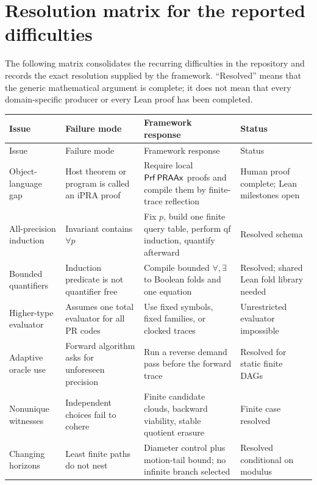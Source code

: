 \section{Resolution matrix for the reported difficulties}
\label{sec:difficulties}

The following matrix consolidates the recurring difficulties in the repository
and records the exact resolution supplied by the framework.  ``Resolved''
means that the generic mathematical argument is complete; it does not mean
that every domain-specific producer or every Lean proof has been completed.

\begin{longtable}{@{}p{}p{}p{}p{}@{}}
\toprule
Issue & Failure mode & Framework response & Status \\
\midrule
\endfirsthead
\toprule
Issue & Failure mode & Framework response & Status \\
\midrule
\endhead
Object-language gap & Host theorem or program is called an iPRA proof &
Require local \(\mathsf{Prf}\,\mathsf{PRAAx}\) proofs and compile them by finite-trace reflection &
Human proof complete; Lean milestones open \\

All-precision induction & Invariant contains \(\forall p\) &
Fix \(p\), build one finite query table, perform qf induction, quantify afterward &
Resolved schema \\

Bounded quantifiers & Induction predicate is not quantifier free &
Compile bounded \(\forall,\exists\) to Boolean folds and one equation &
Resolved; shared Lean fold library needed \\

Higher-type evaluator & Assumes one total evaluator for all PR codes &
Use fixed symbols, fixed families, or clocked traces &
Unrestricted evaluator impossible \\

Adaptive oracle use & Forward algorithm asks for unforeseen precision &
Run a reverse demand pass before the forward trace &
Resolved for static finite DAGs \\

Nonunique witnesses & Independent choices fail to cohere &
Finite candidate clouds, backward viability, stable quotient erasure &
Finite case resolved \\

Changing horizons & Least finite paths do not nest &
Diameter control plus motion-tail bound; no infinite branch selected &
Resolved conditional on modulus \\


\end{longtable}
